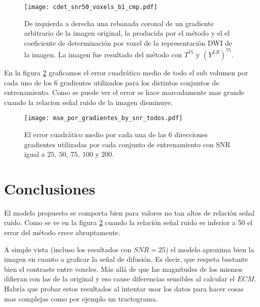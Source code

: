 \documentclass[a4paper,10pt]{article}%
\begin{document}
\begin{figure}[H]
\centering        
\texttt{[image: cdet\_snr50\_voxels\_b1\_cmp.pdf]}
\caption{De izquierda a derecha una rebanada coronal de un gradiente arbitrario de la imagen 
original, la producida por el m\'etodo y el el coeficiente de determinación por voxel de la 
representación DWI de la imagen. La imagen fue resultado del m\'etodo con $T^{75}$ y 
$(Y^{LR})^{75}$.}
\label{cdet_cmp}
\end{figure}


En la figura \ref{mse_por_gradientes_by_snr_todos} graficamos el error 
cuadrático medio de todo el 
sub volumen por cada uno de los 6 gradientes utilizados para los distintos conjuntos de 
entrenamiento. Como se puede ver el error se hace marcadamente mas grande cuando la relacion 
se\~nal ruido de la imagen disminuye. 



\begin{figure}[H]
\centering        
\texttt{[image: mse\_por\_gradientes\_by\_snr\_todos.pdf]}
\caption{El error cuadrático medio por cada una de las 6 direcciones gradientes 
utilizadas por cada conjunto de entrenamiento con SNR igual a $25,\ 50,\ 75,\ 100$ y $200$. }
\label{mse_por_gradientes_by_snr_todos}
\end{figure}

\clearpage
\section{Conclusiones}
%
El modelo propuesto se comporta bien para valores no tan altos de relación señal ruido. Como se ve 
en la figura \ref{mse_por_gradientes_by_snr_todos} cuando la relación señal ruido es 
inferior a 50 el error del método crece abruptamente. 

A simple vista (incluso los resultados con $SNR=25$) el modelo aproxima bien la 
imagen en cuanto a graficar la señal de difusión. Es decir, que respeta 
bastante bien el contraste entre voxeles. Más allá de que las magnitudes de los 
mismos difieran con las de la original y eso cause diferencias sensibles al 
calcular el $ECM$. Habría que probar estos resultados al intentar 
usar los datos para hacer cosas mas complejas como por ejemplo un tractograma.

%



\clearpage


\end{document}
